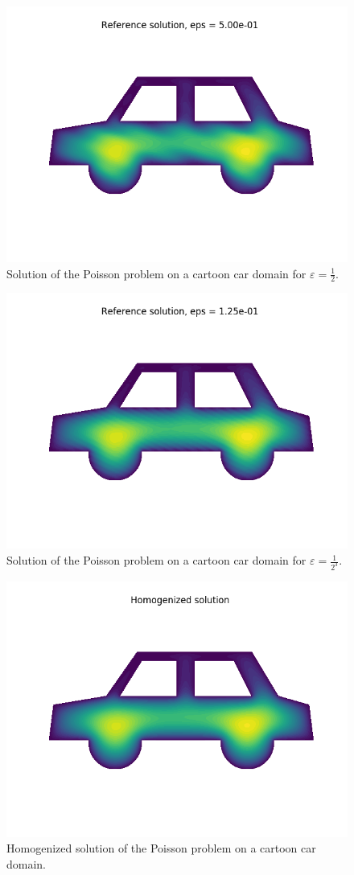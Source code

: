\documentclass{article}
\renewcommand{\epsilon}{\varepsilon}
\begin{document}
  \begin{figure}[h]
    \centering
    \includegraphics[width=0.8\linewidth]{carw_reference_eps_power_1.png}
    \caption{Solution of the Poisson problem on a cartoon car domain for $\epsilon = \frac{1}{2}$.}
    \label{fig:car_reference_1}
  \end{figure}
  \begin{figure}[h]
    \centering
    \includegraphics[width=0.8\linewidth]{carw_reference_eps_power_3.png}
    \caption{Solution of the Poisson problem on a cartoon car domain for $\epsilon = \frac{1}{2^3}$.}
    \label{fig:car_reference_3}
  \end{figure}
  \begin{figure}[h]
    \centering
    \includegraphics[width=0.8\linewidth]{carw_homogenized.png}
    \caption{Homogenized solution of the Poisson problem on a cartoon car domain.}
    \label{fig:car_homogenized}
  \end{figure}
\end{document}
